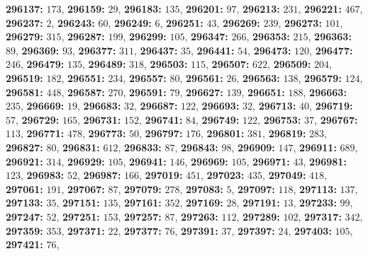 \textsf{\bfseries 296137:} $173$, \textsf{\bfseries 296159:} $29$, \textsf{\bfseries 296183:} $135$, \textsf{\bfseries 296201:} $97$, \textsf{\bfseries 296213:} $231$, \textsf{\bfseries 296221:} $467$, \textsf{\bfseries 296237:} $2$, \textsf{\bfseries 296243:} $60$, \textsf{\bfseries 296249:} $6$, \textsf{\bfseries 296251:} $43$, \textsf{\bfseries 296269:} $239$, \textsf{\bfseries 296273:} $101$, \textsf{\bfseries 296279:} $315$, \textsf{\bfseries 296287:} $199$, \textsf{\bfseries 296299:} $105$, \textsf{\bfseries 296347:} $266$, \textsf{\bfseries 296353:} $215$, \textsf{\bfseries 296363:} $89$, \textsf{\bfseries 296369:} $93$, \textsf{\bfseries 296377:} $311$, \textsf{\bfseries 296437:} $35$, \textsf{\bfseries 296441:} $54$, \textsf{\bfseries 296473:} $120$, \textsf{\bfseries 296477:} $246$, \textsf{\bfseries 296479:} $135$, \textsf{\bfseries 296489:} $318$, \textsf{\bfseries 296503:} $115$, \textsf{\bfseries 296507:} $622$, \textsf{\bfseries 296509:} $204$, \textsf{\bfseries 296519:} $182$, \textsf{\bfseries 296551:} $234$, \textsf{\bfseries 296557:} $80$, \textsf{\bfseries 296561:} $26$, \textsf{\bfseries 296563:} $138$, \textsf{\bfseries 296579:} $124$, \textsf{\bfseries 296581:} $448$, \textsf{\bfseries 296587:} $270$, \textsf{\bfseries 296591:} $79$, \textsf{\bfseries 296627:} $139$, \textsf{\bfseries 296651:} $188$, \textsf{\bfseries 296663:} $235$, \textsf{\bfseries 296669:} $19$, \textsf{\bfseries 296683:} $32$, \textsf{\bfseries 296687:} $122$, \textsf{\bfseries 296693:} $32$, \textsf{\bfseries 296713:} $40$, \textsf{\bfseries 296719:} $57$, \textsf{\bfseries 296729:} $165$, \textsf{\bfseries 296731:} $152$, \textsf{\bfseries 296741:} $84$, \textsf{\bfseries 296749:} $122$, \textsf{\bfseries 296753:} $37$, \textsf{\bfseries 296767:} $113$, \textsf{\bfseries 296771:} $478$, \textsf{\bfseries 296773:} $50$, \textsf{\bfseries 296797:} $176$, \textsf{\bfseries 296801:} $381$, \textsf{\bfseries 296819:} $283$, \textsf{\bfseries 296827:} $80$, \textsf{\bfseries 296831:} $612$, \textsf{\bfseries 296833:} $87$, \textsf{\bfseries 296843:} $98$, \textsf{\bfseries 296909:} $147$, \textsf{\bfseries 296911:} $689$, \textsf{\bfseries 296921:} $314$, \textsf{\bfseries 296929:} $105$, \textsf{\bfseries 296941:} $146$, \textsf{\bfseries 296969:} $105$, \textsf{\bfseries 296971:} $43$, \textsf{\bfseries 296981:} $123$, \textsf{\bfseries 296983:} $52$, \textsf{\bfseries 296987:} $166$, \textsf{\bfseries 297019:} $451$, \textsf{\bfseries 297023:} $435$, \textsf{\bfseries 297049:} $418$, \textsf{\bfseries 297061:} $191$, \textsf{\bfseries 297067:} $87$, \textsf{\bfseries 297079:} $278$, \textsf{\bfseries 297083:} $5$, \textsf{\bfseries 297097:} $118$, \textsf{\bfseries 297113:} $137$, \textsf{\bfseries 297133:} $35$, \textsf{\bfseries 297151:} $135$, \textsf{\bfseries 297161:} $352$, \textsf{\bfseries 297169:} $28$, \textsf{\bfseries 297191:} $13$, \textsf{\bfseries 297233:} $99$, \textsf{\bfseries 297247:} $52$, \textsf{\bfseries 297251:} $153$, \textsf{\bfseries 297257:} $87$, \textsf{\bfseries 297263:} $112$, \textsf{\bfseries 297289:} $102$, \textsf{\bfseries 297317:} $342$, \textsf{\bfseries 297359:} $353$, \textsf{\bfseries 297371:} $22$, \textsf{\bfseries 297377:} $76$, \textsf{\bfseries 297391:} $37$, \textsf{\bfseries 297397:} $24$, \textsf{\bfseries 297403:} $105$, \textsf{\bfseries 297421:} $76$, 
